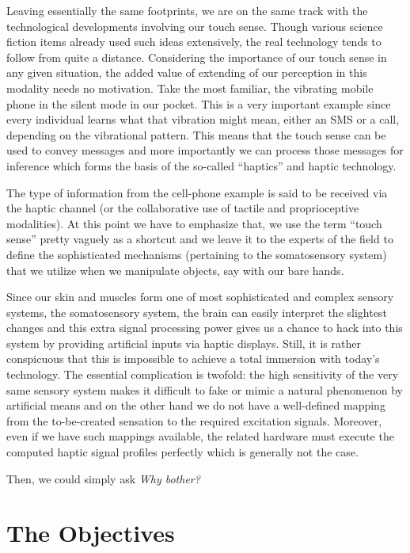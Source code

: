 Leaving essentially the same footprints, we are on the same track with the technological developments involving our touch sense. Though various science fiction items already used such ideas extensively, the real technology tends to follow from quite a distance.  Considering the importance of our touch sense in any given situation, the added value of extending of our perception in this modality needs no motivation. Take the most familiar, the vibrating mobile phone in the silent mode in our pocket. This is a very important example since every individual learns what that vibration might mean, either an SMS or a call, depending on the vibrational pattern. This means that the touch sense can be used to convey messages and more importantly we can process those messages for inference which forms the basis of the so-called \enquote{haptics} and haptic technology.


The type of information from the cell-phone example is said to be received via the haptic channel (or the collaborative use of tactile and proprioceptive modalities). At this point we have to emphasize that, we use the term \enquote{touch sense} pretty vaguely as a shortcut and we leave it to the experts of the field to define the sophisticated mechanisms (pertaining to the somatosensory system) that we utilize when we manipulate objects, say with our bare hands. 


Since our skin and muscles form one of most sophisticated and complex sensory systems, the somatosensory system, the brain can easily interpret the slightest changes and this extra signal processing power gives us a chance to hack into this system by providing artificial inputs via haptic displays. Still, it is rather conspicuous that this is impossible to achieve a total immersion with today's technology. The essential complication is twofold: the high sensitivity of the very same sensory system makes it difficult to fake or mimic a natural phenomenon by artificial means and on the other hand we do not have a well-defined mapping from the to-be-created sensation to the required excitation signals. Moreover, even if we have such mappings available, the related hardware must execute the computed haptic signal profiles perfectly which is generally not the case.

Then, we could simply ask \emph{Why bother?} 


\section{The Objectives}
\label{sec:intro:obj}


